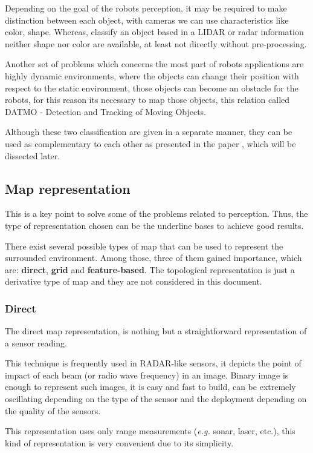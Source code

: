 Depending on the goal of the robots perception, it may be required to make distinction between each object, with cameras we can use characteristics like color, shape. Whereas, classify an object based in a LIDAR or radar information neither shape nor color are available, at least not directly without pre-processing.

Another set of problems which concerns the most part of robots applications are highly dynamic environments, where the objects can change their position with respect to the static environment, those objects can become an obstacle for the robots, for this reason its necessary to map those objects, this relation called DATMO - Detection and Tracking of Moving Objects.

Although these two classification are given in a separate manner, they can be used as complementary to each other as presented in the paper \cite{Wang04a}, which will be dissected later.

\subsection{Map representation}

This is a key point to solve some of the problems related to perception. Thus, the type of representation chosen can be the underline bases to achieve good results.

There exist several possible types of map that can be used to represent the surrounded environment. Among those, three of them gained importance, which are: \textbf{direct}, \textbf{grid} and \textbf{feature-based}\cite{Wang04a}. The topological representation is just a derivative type of map and they are not considered in this document.

\subsubsection{Direct}

The direct map representation, is nothing but a straightforward representation of a sensor reading. 

This technique is frequently used in RADAR-like sensors, it depicts the point of impact of each beam (or radio wave frequency) in an image. Binary image is enough to represent such images, it is easy and fast to build, can be extremely oscillating depending on the type of the sensor and the deployment depending on the quality of the sensors.

This representation uses only range measurements (\textit{e.g.} sonar, laser, etc.), this kind of representation is very convenient due to its simplicity. 

